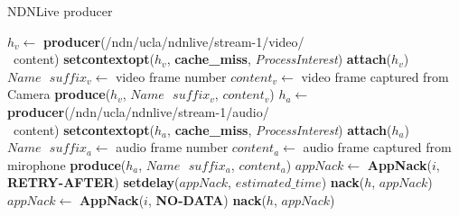 \begin{algorithm}[ht]
\caption{NDNLive producer}
\label{alg:liveproducer}
\begin{algorithmic}[1]
\State $h_v \leftarrow $ \textbf{producer}(/ndn/ucla/ndnlive/stream-1/video/ \\\ content)
\State \textbf{setcontextopt}($h_v$, \textbf{cache\_miss}, \textit{ProcessInterest})
\State \textbf{attach}($h_v$)
\vspace{0.2cm}
	\State $Name \textbf{ } suffix_v \leftarrow $ video frame number
	\State $content_v \leftarrow $ video frame captured from Camera
	\State \textbf{produce}($h_v$, $Name\textbf{ }suffix_v$, $content_v$)
	\EndWhile
\vspace{0.2cm}
\vspace{0.2cm}
\State $h_a \leftarrow $ \textbf{producer}(/ndn/ucla/ndnlive/stream-1/audio/ \\\  content)
\State \textbf{setcontextopt}($h_a$, \textbf{cache\_miss}, \textit{ProcessInterest})
\State \textbf{attach}($h_a$)
\vspace{0.2cm}
	\State $Name \textbf{ } suffix_a \leftarrow $ audio frame number
	\State $content_a \leftarrow $ audio frame captured from mirophone
	\State \textbf{produce}($h_a$, $Name\textbf{ }suffix_a$, $content_a$)
	\EndWhile
\vspace{0.4cm}
    \State $appNack \leftarrow $ \textbf{AppNack}($i$, \textbf{RETRY-AFTER})
    \State \textbf{setdelay}($appNack$, $estimated\_time$)
    \State \textbf{nack}($h$, $appNack$)
  \EndIf
    \State $appNack \leftarrow $ \textbf{AppNack}($i$, \textbf{NO-DATA})
    \State \textbf{nack}($h$, $appNack$)
  \EndIf
\EndFunction
\end{algorithmic}
\end{algorithm}


